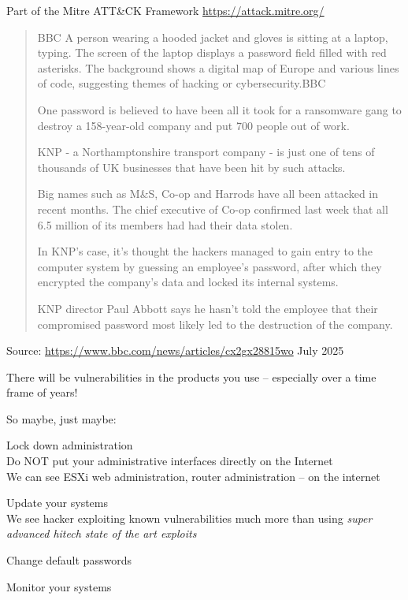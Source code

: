 \documentclass[Screen16to9,17pt]{foils}
\begin{document}
\begin{list2}
    \item Part of the Mitre ATT\&CK Framework \url{https://attack.mitre.org/}
\end{list2}




\begin{quote}
BBC A person wearing a hooded jacket and gloves is sitting at a laptop, typing. The screen of the laptop displays a password field filled with red asterisks. The background shows a digital map of Europe and various lines of code, suggesting themes of hacking or cybersecurity.BBC

One password is believed to have been all it took for a ransomware gang to destroy a 158-year-old company and put 700 people out of work.

KNP - a Northamptonshire transport company - is just one of tens of thousands of UK businesses that have been hit by such attacks.

Big names such as M\&S, Co-op and Harrods have all been attacked in recent months. The chief executive of Co-op confirmed last week that all 6.5 million of its members had had their data stolen.

In KNP's case, it's thought the hackers managed to gain entry to the computer system by guessing an employee's password, after which they encrypted the company's data and locked its internal systems.

KNP director Paul Abbott says he hasn't told the employee that their compromised password most likely led to the destruction of the company.
\end{quote}
Source: \url{https://www.bbc.com/news/articles/cx2gx28815wo} July 2025



There will be vulnerabilities in the products you use -- especially over a time frame of years!

So maybe, just maybe:
\begin{list2}
\item Lock down administration\\
Do NOT put your administrative interfaces directly on the Internet\\
We can see ESXi web administration, router administration -- on the internet
\item Update your systems\\
We see hacker exploiting known vulnerabilities much more than using \emph{super advanced hitech state of the art exploits}
\item Change default passwords
\item Monitor your systems
\end{list2}
\end{document}
